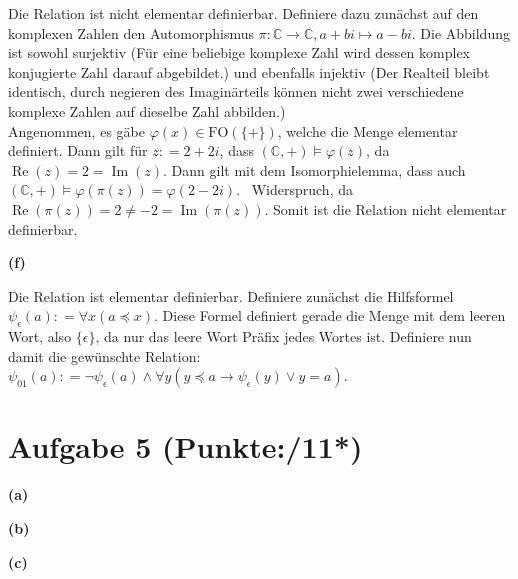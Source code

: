 \documentclass[11pt, a4paper]{article}
\newcommand{\pppp}{11*}
\newcommand{\defgr}{\mathrel{\mathop:\!\!=}}
\begin{document}
\begin{adjustwidth}{20pt}{20pt}
	Die Relation ist nicht elementar definierbar. Definiere dazu zunächst auf den komplexen Zahlen den Automorphismus $\pi:\mathbb{C} \to \mathbb{C}, a+bi \mapsto a-bi$. Die Abbildung
	ist sowohl surjektiv (Für eine beliebige komplexe Zahl wird dessen komplex konjugierte Zahl darauf abgebildet.) und ebenfalls injektiv (Der Realteil bleibt identisch, durch negieren des
	Imaginärteils können nicht zwei verschiedene komplexe Zahlen auf dieselbe Zahl abbilden.)\\
	Angenommen, es gäbe $\varphi(x) \in \text{FO}(\{ +\})$, welche die Menge elementar definiert. Dann gilt für $z \defgr 2+2i$, dass $(\mathbb{C},+) \models \varphi(z)$, da
	$\operatorname{Re}(z)=2=\operatorname{Im}(z)$. Dann gilt mit dem Isomorphielemma, dass auch $(\mathbb{C},+) \models \varphi(\pi(z))=\varphi(2-2i)$. \Lightning\ Widerspruch, da
	$\operatorname{Re}(\pi(z))=2\neq -2=\operatorname{Im}(\pi(z))$. Somit ist die Relation nicht elementar definierbar.
\end{adjustwidth}
\textbf{(f)}
\begin{adjustwidth}{20pt}{20pt}
	Die Relation ist elementar definierbar. Definiere zunächst die Hilfsformel $\psi_\epsilon(a) \defgr \forall x(a \preceq x)$. Diese Formel definiert gerade die Menge mit dem leeren Wort, also
	$\{\epsilon\}$, da nur das leere Wort Präfix jedes Wortes ist. Definiere nun damit die gewünschte Relation:\\
	$\psi_{01}(a) \defgr \neg\psi_\epsilon(a) \wedge \forall y(y \preceq a \rightarrow \psi_\epsilon(y) \vee y=a)$.
\end{adjustwidth}


\section*{Aufgabe 5 (Punkte:\qquad/\pppp)}
\textbf{(a)}
\begin{adjustwidth}{20pt}{20pt}

\end{adjustwidth}
\textbf{(b)}
\begin{adjustwidth}{20pt}{20pt}

\end{adjustwidth}
\textbf{(c)}
\begin{adjustwidth}{20pt}{20pt}

\end{adjustwidth}
\end{document}
